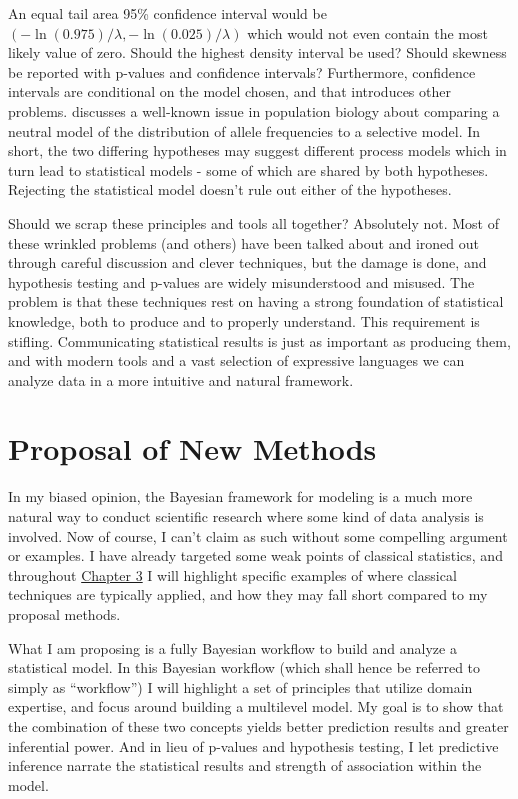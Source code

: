 \documentclass[11pt, oneside, openany]{scrbook}
\begin{document}
An equal tail area 95\% confidence interval would be \(\left(-\ln(0.975)/\lambda, -\ln(0.025)/\lambda\right)\) which would not even contain the most likely value of zero. Should the highest density interval be used? Should skewness be reported with p-values and confidence intervals? Furthermore, confidence intervals are conditional on the model chosen, and that introduces other problems. \citet{mcelreath2020statistical} discusses a well-known issue in population biology about comparing a neutral model of the distribution of allele frequencies to a selective model. In short, the two differing hypotheses may suggest different process models which in turn lead to statistical models - some of which are shared by both hypotheses. Rejecting the statistical model doesn't rule out either of the hypotheses.

Should we scrap these principles and tools all together? Absolutely not. Most of these wrinkled problems (and others) have been talked about and ironed out through careful discussion and clever techniques, but the damage is done, and hypothesis testing and p-values are widely misunderstood and misused. The problem is that these techniques rest on having a strong foundation of statistical knowledge, both to produce and to properly understand. This requirement is stifling. Communicating statistical results is just as important as producing them, and with modern tools and a vast selection of expressive languages we can analyze data in a more intuitive and natural framework.

\hypertarget{ch010-new-methods}{%
\section{Proposal of New Methods}\label{ch010-new-methods}}

In my biased opinion, the Bayesian framework for modeling is a much more natural way to conduct scientific research where some kind of data analysis is involved. Now of course, I can't claim as such without some compelling argument or examples. I have already targeted some weak points of classical statistics, and throughout \protect\hyperlink{workflow}{Chapter 3} I will highlight specific examples of where classical techniques are typically applied, and how they may fall short compared to my proposal methods.

What I am proposing is a fully Bayesian workflow to build and analyze a statistical model. In this Bayesian workflow (which shall hence be referred to simply as ``workflow'') I will highlight a set of principles that utilize domain expertise, and focus around building a multilevel model. My goal is to show that the combination of these two concepts yields better prediction results and greater inferential power. And in lieu of p-values and hypothesis testing, I let predictive inference narrate the statistical results and strength of association within the model.
\end{document}
